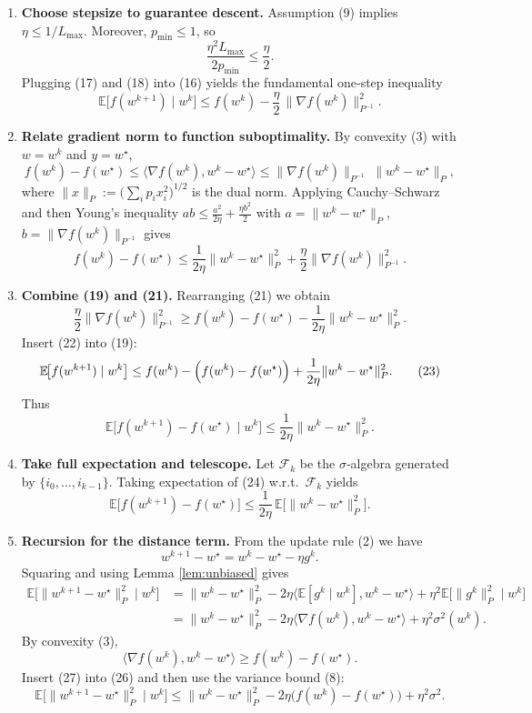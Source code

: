 \documentclass{article}
\begin{document}
\begin{enumerate}[label=[Step \arabic*]]
\item \textbf{Choose stepsize to guarantee descent.}  
Assumption (9) implies $\eta\le 1/L_{\max}$. Moreover, $p_{\min}\le 1$, so
\[
\frac{\eta^{2}L_{\max}}{2p_{\min}}\le\frac{\eta}{2}.
\tag{18}
\]
Plugging (17) and (18) into (16) yields the fundamental one‑step inequality
\[
\mathbb{E}\!\bigl[f(w^{k+1})\mid w^{k}\bigr]
\le f(w^{k})-\frac{\eta}{2}\,\bigl\|\nabla f(w^{k})\bigr\|_{P^{-1}}^{2}.
\tag{19}
\]

\item \textbf{Relate gradient norm to function suboptimality.}  
By convexity (3) with $w=w^{k}$ and $y=w^{\star}$,
\[
f(w^{k})-f(w^{\star})\le\langle\nabla f(w^{k}),w^{k}-w^{\star}\rangle
\le\|\nabla f(w^{k})\|_{P^{-1}}\;\|w^{k}-w^{\star}\|_{P},
\tag{20}
\]
where $\|x\|_{P}:=\bigl(\sum_{i}p_i x_i^{2}\bigr)^{1/2}$ is the dual norm.
Applying Cauchy–Schwarz and then Young’s inequality $ab\le\frac{a^{2}}{2\eta}+\frac{\eta b^{2}}{2}$ with $a=\|w^{k}-w^{\star}\|_{P}$, $b=\|\nabla f(w^{k})\|_{P^{-1}}$ gives
\[
f(w^{k})-f(w^{\star})
\le \frac{1}{2\eta}\|w^{k}-w^{\star}\|_{P}^{2}
   +\frac{\eta}{2}\|\nabla f(w^{k})\|_{P^{-1}}^{2}.
\tag{21}
\]

\item \textbf{Combine (19) and (21).}  
Rearranging (21) we obtain
\[
\frac{\eta}{2}\|\nabla f(w^{k})\|_{P^{-1}}^{2}
\ge f(w^{k})-f(w^{\star})-\frac{1}{2\eta}\|w^{k}-w^{\star}\|_{P}^{2}.
\tag{22}
\]
Insert (22) into (19):
\[
\mathbb{E}\!\bigl[f(w^{k+1})\mid w^{k}\bigr]
\le f(w^{k})-\Bigl(f(w^{k})-f(w^{\star})\Bigr)
   +\frac{1}{2\eta}\|w^{k}-w^{\star}\|_{P}^{2}.
\tag{23}
\]
Thus
\[
\mathbb{E}\!\bigl[f(w^{k+1})-f(w^{\star})\mid w^{k}\bigr]
\le \frac{1}{2\eta}\|w^{k}-w^{\star}\|_{P}^{2}.
\tag{24}
\]

\item \textbf{Take full expectation and telescope.}  
Let $\mathcal{F}_{k}$ be the $\sigma$‑algebra generated by $\{i_0,\dots,i_{k-1}\}$.
Taking expectation of (24) w.r.t.\ $\mathcal{F}_{k}$ yields
\[
\mathbb{E}\!\bigl[f(w^{k+1})-f(w^{\star})\bigr]
\le \frac{1}{2\eta}\,\mathbb{E}\!\bigl[\|w^{k}-w^{\star}\|_{P}^{2}\bigr].
\tag{25}
\]

\item \textbf{Recursion for the distance term.}  
From the update rule (2) we have
\[
w^{k+1}-w^{\star}=w^{k}-w^{\star}-\eta g^{k}.
\]
Squaring and using Lemma \ref{lem:unbiased} gives
\begin{align}
\mathbb{E}\!\bigl[\|w^{k+1}-w^{\star}\|_{P}^{2}\mid w^{k}\bigr]
&= \|w^{k}-w^{\star}\|_{P}^{2}
   -2\eta\langle\mathbb{E}[g^{k}\mid w^{k}],w^{k}-w^{\star}\rangle
   +\eta^{2}\mathbb{E}\!\bigl[\|g^{k}\|_{P}^{2}\mid w^{k}\bigr]\nonumber\\
&= \|w^{k}-w^{\star}\|_{P}^{2}
   -2\eta\langle\nabla f(w^{k}),w^{k}-w^{\star}\rangle
   +\eta^{2}\sigma^{2}(w^{k}). \tag{26}
\end{align}
By convexity (3),
\[
\langle\nabla f(w^{k}),w^{k}-w^{\star}\rangle
\ge f(w^{k})-f(w^{\star}).
\tag{27}
\]
Insert (27) into (26) and then use the variance bound (8):
\[
\mathbb{E}\!\bigl[\|w^{k+1}-w^{\star}\|_{P}^{2}\mid w^{k}\bigr]
\le \|w^{k}-w^{\star}\|_{P}^{2}
   -2\eta\bigl(f(w^{k})-f(w^{\star})\bigr)
   +\eta^{2}\sigma^{2}.
\tag{28}
\]


\end{enumerate}
\end{document}
